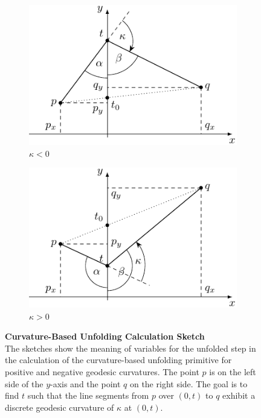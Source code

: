 \documentclass{stdlocal}
\begin{document}
    \begin{figure}
      \centering
      \begin{subfigure}[b]{0.49\linewidth}
        \centering
        \includegraphics[width=\linewidth]{figures/unfolding_curvature_2d.pdf}
        \caption{$κ < 0$}
      \end{subfigure}
      \hfill
      \begin{subfigure}[b]{0.49\linewidth}
        \centering
        \includegraphics[width=\linewidth]{figures/unfolding_curvature_2d_positive.pdf}
        \caption{$κ > 0$}
      \end{subfigure}
      \caption[Curvature-Based Unfolding Calculation Sketch]{%
        \textbf{Curvature-Based Unfolding Calculation Sketch}\\
        The sketches show the meaning of variables for the unfolded step in the calculation of the curvature-based unfolding primitive for positive and negative geodesic curvatures.
        The point $p$ is on the left side of the $y$-axis and the point $q$ on the right side.
        The goal is to find $t$ such that the line segments from $p$ over $(0,t)$ to $q$ exhibit a discrete geodesic curvature of $κ$ at $(0,t)$.
      }
      \label{fig:curvature-unfolding}
    \end{figure}
\end{document}
